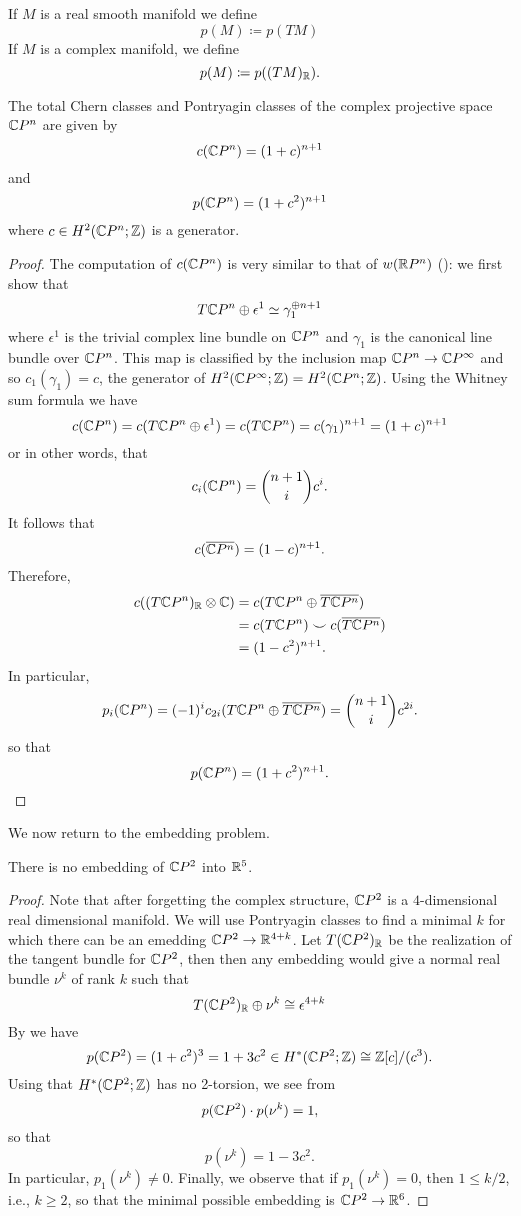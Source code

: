 \documentclass[ma3408.tex]{subfiles}
\begin{document}
\begin{Def}
If $M$ is a real smooth manifold we define
\[
p(M) \coloneqq p(TM)
\]
If $M$ is a complex manifold, we define
\[
p(M) \coloneqq p((TM)_{\mathbb{R}}).
\]
\end{Def}
\begin{Thm}\label{thm:pont-cpn}
The total Chern classes and Pontryagin classes of the complex projective space $\mathbb{C} P^n$ are given by
\[
c(\mathbb{C} P^n) = (1+c)^{n+1}
\]
and
\[
p(\mathbb{C} P^n) = (1+c^2)^{n+1}
\]
where $c \in H^2(\mathbb{C} P^n;\mathbb{Z})$ is a generator. 
\end{Thm}
\begin{proof}
The computation of $c(\mathbb{C} P^n)$ is very similar to that of $w(\mathbb{R} P^n)$ (): we first show that
\[
T\mathbb{C} P^n \oplus \epsilon^1 \simeq \gamma_1^{\oplus n+1}
\]
where $\epsilon^1$ is the trivial complex line bundle on $\mathbb{C} P^n$ and $\gamma_1$ is the canonical line bundle over $\mathbb{C} P^n$. This map is classified by the inclusion map $\mathbb{C} P^n \to \mathbb{C} P^{\infty}$ and so $c_1(\gamma_1) = c$, the generator of $H^2(\mathbb{C} P^{\infty};\mathbb{Z}) = H^2(\mathbb{C} P^n;\mathbb{Z})$. Using the Whitney sum formula we have
\[
c(\mathbb{C} P^n) = c(T \mathbb{C} P^n \oplus \epsilon^1) = c(T\mathbb{C} P^n) = c(\gamma_1)^{n+1} = (1+c)^{n+1}
\]
or in other words, that 
\[
c_i(\mathbb{C} P^n) = \binom{n+1}{i}c^i.
\]
It follows that 
\[
c(\overline {\mathbb{C} P^n})  = (1-c)^{n+1}. 
\]
Therefore,
\[
\begin{split}
c((T \mathbb{C} P^n)_{\mathbb{R}} \otimes \mathbb{C}) & = c(T \mathbb{C} P^n \oplus \overline {T\mathbb{C} P^n}) \\
&= c(T\mathbb{C} P^n) \smile c(\overline{T \mathbb{C} P^n}) \\
& = (1-c^2)^{n+1}.
\end{split}
\]
In particular, 
\[
p_i(\mathbb{C} P^n) = (-1)^ic_{2i}(T \mathbb{C} P^n \oplus \overline {T\mathbb{C} P^n}) = \binom{n+1}{i}c^{2i}.
\]
so that
\[
p(\mathbb{C} P^n) = (1+c^2)^{n+1}. \qedhere
\]

\end{proof}
We now return to the embedding problem. 
\begin{Prop}
There is no embedding of $\mathbb{C} P^2$ into $\mathbb{R}^5$.
\end{Prop}
\begin{proof}
Note that after forgetting the complex structure, $\mathbb{C} P^2$ is a $4$-dimensional real dimensional manifold. We will use Pontryagin classes to find a minimal $k$ for which there can be an emedding $\mathbb{C} P^2 \to \mathbb{R}^{4+k}$. Let $T(\mathbb{C} P^2)_{\mathbb{R}}$ be the realization of the tangent bundle for $\mathbb{C} P^2$, then then any embedding would give a normal real bundle $\nu^k$ of rank $k$ such that
\[
T(\mathbb{C} P^2)_{\mathbb{R}} \oplus \nu^k \cong \epsilon^{4+k}
\]
By  we have
\[
p(\mathbb{C} P^2) = (1+c^2)^3 = 1+3c^2 \in H^*(\mathbb{C} P^2;\mathbb{Z}) \cong \mathbb{Z}[c]/(c^3).
\]
Using that $H^*(\mathbb{C} P^2;\mathbb{Z})$ has no 2-torsion, we see from 
\[
p(\mathbb{C} P^2)\cdot p(\nu^k) = 1,
\]
so that
\[
p(\nu^k) = 1-3c^2.
\]
In particular, $p_1(\nu^k) \ne 0$. Finally, we observe that if $p_1(\nu^k) = 0$, then $1 \le k/2$, i.e., $k \ge 2$, so that the minimal possible embedding is $\mathbb{C} P^2 \to \mathbb{R}^6$.
\end{proof}
\end{document}
